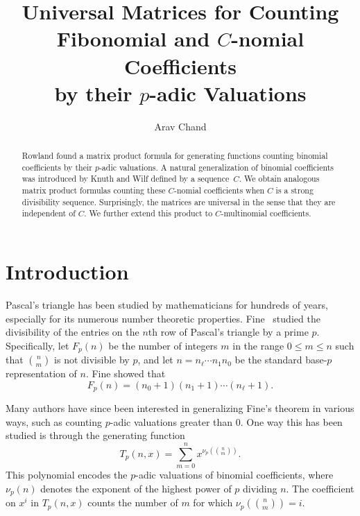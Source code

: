 \documentclass{amsart}
\theoremstyle{definition}
\begin{document}
\title[Universal Matrices for Counting $C$-nomial Coefficients]{Universal Matrices for Counting \\ Fibonomial and $C$-nomial Coefficients\\ by their $p$-adic Valuations}

\author{Arav Chand}
\begin{abstract}
Rowland found a matrix product formula for generating functions counting binomial coefficients by their $p$-adic valuations. A natural generalization of binomial coefficients was introduced by Knuth and Wilf defined by a sequence~$C$. We obtain analogous matrix product formulas counting these $C$-nomial coefficients when $C$ is a strong divisibility sequence. Surprisingly, the matrices are universal in the sense that they are independent of $C$. We further extend this product to $C$-multinomial coefficients.
\end{abstract}

\maketitle

\section{Introduction}\label{section:introduction}

Pascal's triangle has been studied by mathematicians for hundreds of years, especially for its numerous number theoretic properties. Fine~\cite{Fine1947} studied the divisibility of the entries on the $n$th row of Pascal's triangle by a prime $p$. Specifically, let $F_p(n)$ be the number of integers $m$ in the range $0 \leq m \leq n$ such that $\binom{n}{m}$ is not divisible by $p$, and let $n = n_{\ell}\cdots n_1n_0$ be the standard base-$p$ representation of $n$. Fine  showed that $$F_p(n)=(n_0+1)(n_1+1)\cdots(n_\ell+1).$$

Many authors have since been interested in generalizing Fine's theorem in various ways, such as counting $p$-adic valuations greater than $0$. One way this has been studied is through the generating function
$$
T_p(n, x) = \sum_{m=0}^n x^{\nu_p \left( \binom{n}{m} \right)}.
$$
This polynomial encodes the $p$-adic valuations of binomial coefficients, where $\nu_p(n)$ denotes the exponent of the highest power of $p$ dividing $n$. The coefficient on $x^i$ in $T_p(n, x)$ counts the number of $ m $ for which $ \nu_p\!\left( \binom{n}{m} \right) = i $. 
\end{document}
